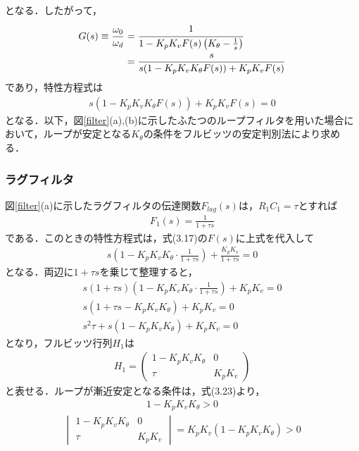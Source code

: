 となる．したがって，
\begin{align}
G(s) \equiv \frac{\omega_0}{\omega_d} &=\cfrac{1}{1-K_p K_v F(s) \left(K_\theta-\frac{1}{s}\right)} \\ 
&=\frac{s}{s(1-K_pK_vK_\theta F(s))+K_pK_vF(s)}
\end{align}
であり，特性方程式は
\begin{align}
s(1-K_pK_vK_\theta F(s))+K_pK_vF(s)=0
\end{align}
となる．以下，図\ref{filter}(a),(b)に示したふたつのループフィルタを用いた場合において，ループが安定となる$K_\theta$の条件をフルビッツの安定判別法により求める．

\subsubsection{ラグフィルタ}
図\ref{filter}(a)に示したラグフィルタの伝達関数$F_{lag}(s)$は，$R_1C_1=\tau$とすれば
\begin{align}
F_1(s)=\frac{1}{1+\tau s}
\end{align}
である．このときの特性方程式は，式(3.17)の$F(s)$に上式を代入して
\begin{align}
s \left(1-K_pK_vK_\theta \cdot \frac{1}{1+\tau s} \right) + \frac{K_pK_v}{1+\tau s}=0
\end{align}
となる．両辺に$1+\tau s$を乗じて整理すると，
\begin{align}
s(1+\tau s) \left(1-K_pK_vK_\theta \cdot \frac{1}{1+\tau s} \right)+K_pK_v =0 \\
s(1+\tau s -K_pK_vK_\theta)+K_pK_v=0 \\
s^2 \tau +s(1-K_pK_vK_\theta)+K_pK_v=0
\end{align}
となり，フルビッツ行列$H_1$は
\begin{align}
H_1=
\begin{pmatrix}
1-K_pK_vK_\theta & 0 \\
\tau & K_pK_v
\end{pmatrix}
\end{align}
と表せる．ループが漸近安定となる条件は，式(3.23)より，
\begin{align}
1-K_pK_vK_\theta>0 
\end{align}
\begin{align}
\begin{vmatrix}
1-K_pK_vK_\theta & 0 \\
\tau & K_pK_v
\end{vmatrix}
=K_pK_v(1-K_pK_vK_\theta)>0
\end{align}
